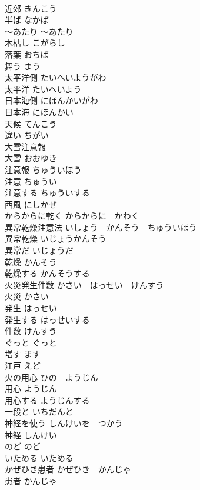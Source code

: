 \documentclass[8pt]{extreport}
\begin{document}
\begin{CJK}{UTF8}{min}
\\	近郊	きんこう	
\\	半ば	なかば	
\\	〜あたり	〜あたり	
\\	木枯し	こがらし	
\\	落葉	おちば	
\\	舞う	まう	
\\	太平洋側	たいへいようがわ	
\\	太平洋	たいへいよう	
\\	日本海側	にほんかいがわ	
\\	日本海	にほんかい	
\\	天候	てんこう	
\\	違い	ちがい	
\\	大雪注意報	
\\	大雪	おおゆき	
\\	注意報	ちゅういほう	
\\	注意	ちゅうい	
\\	注意する	ちゅういする	
\\	西風	にしかぜ	
\\	からからに乾く	からからに　かわく	
\\	異常乾燥注意法	いしょう　かんそう　ちゅういほう	
\\	異常乾燥	いじょうかんそう	
\\	異常だ	いじょうだ	
\\	乾燥	かんそう	
\\	乾燥する	かんそうする	
\\	火災発生件数	かさい　はっせい　けんすう	
\\	火災	かさい	
\\	発生	はっせい	
\\	発生する	はっせいする	
\\	件数	けんすう	
\\	ぐっと	ぐっと	
\\	増す	ます	
\\	江戸	えど	
\\	火の用心	ひの　ようじん	
\\	用心	ようじん	
\\	用心する	ようじんする	
\\	一段と	いちだんと	
\\	神経を使う	しんけいを　つかう	
\\	神経	しんけい	
\\	のど	のど	
\\	いためる	いためる	
\\	かぜひき患者	かぜひき　かんじゃ	
\\	患者	かんじゃ	

\end{CJK}
\end{document}

